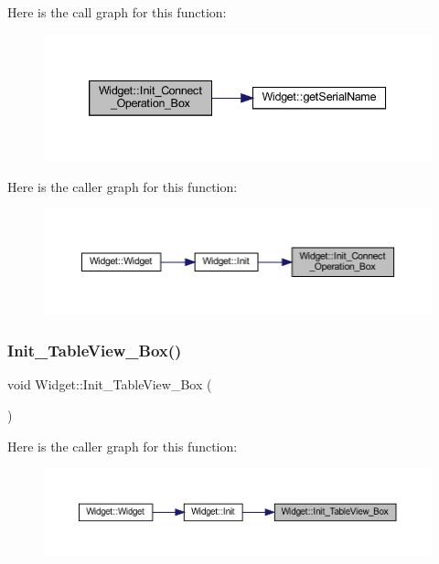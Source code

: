 Here is the call graph for this function\+:
\nopagebreak
\begin{figure}[H]
\begin{center}
\leavevmode
\includegraphics[width=339pt]{class_widget_a73ede9961382ea942361e9845fa11aa0_cgraph}
\end{center}
\end{figure}
Here is the caller graph for this function\+:
\nopagebreak
\begin{figure}[H]
\begin{center}
\leavevmode
\includegraphics[width=350pt]{class_widget_a73ede9961382ea942361e9845fa11aa0_icgraph}
\end{center}
\end{figure}
\mbox{\label{class_widget_a2fb10278c840ae57af473502a583ab20}} 
\subsubsection{\texorpdfstring{Init\_TableView\_Box()}{Init\_TableView\_Box()}}
{\footnotesize\ttfamily void Widget\+::\+Init\+\_\+\+Table\+View\+\_\+\+Box (\begin{DoxyParamCaption}{ }\end{DoxyParamCaption})}

Here is the caller graph for this function\+:
\nopagebreak
\begin{figure}[H]
\begin{center}
\leavevmode
\includegraphics[width=350pt]{class_widget_a2fb10278c840ae57af473502a583ab20_icgraph}
\end{center}
\end{figure}
\mbox{\label{class_widget_a0565863c4d5f710fa6b503767027959b}} 
